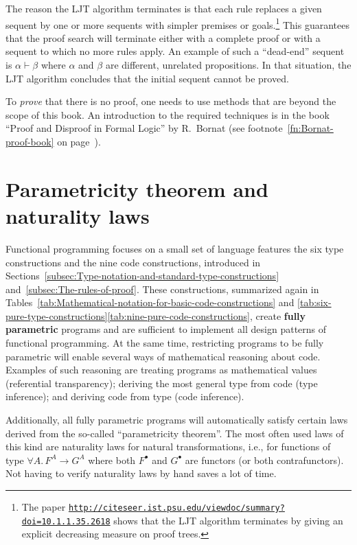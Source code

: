 The reason the LJT algorithm terminates is that each rule replaces
a given sequent by one or more sequents with simpler premises or goals.\footnote{The paper \texttt{\href{http://citeseer.ist.psu.edu/viewdoc/summary?doi=10.1.1.35.2618}{http://citeseer.ist.psu.edu/viewdoc/summary?doi=10.1.1.35.2618}}
shows that the LJT algorithm terminates by giving an explicit decreasing
measure on proof trees.} This guarantees that the proof search will terminate either with
a complete proof or with a sequent to which no more rules apply. An
example of such a \textsf{``}dead-end\textsf{''} sequent is $\alpha\vdash\beta$ where
$\alpha$ and $\beta$ are different, unrelated propositions. In that
situation, the LJT algorithm concludes that the initial sequent cannot
be proved.

To \emph{prove} that there is no proof, one needs to use methods
that are beyond the scope of this book. An introduction to the required
techniques is in the book \textsf{``}Proof and Disproof in Formal Logic\textsf{''}
by R.~Bornat (see footnote~\ref{fn:Bornat-proof-book}
on page~\pageref{fn:Bornat-proof-book}).

\chapter{Parametricity theorem and naturality laws\label{app:Proofs-of-naturality-parametricity}}

Functional programming focuses on a small set of language features
\textemdash{} the six type constructions and the nine code constructions,
introduced in Sections~\ref{subsec:Type-notation-and-standard-type-constructions}
and~\ref{subsec:The-rules-of-proof}. These constructions, summarized
again in Tables~\ref{tab:Mathematical-notation-for-basic-code-constructions}
and \ref{tab:six-pure-type-constructions}\textendash \ref{tab:nine-pure-code-constructions},
create \textbf{fully parametric} programs
and are sufficient to implement all design patterns of functional
programming. At the same time, restricting programs to be fully parametric
will enable several ways of mathematical reasoning about code. Examples
of such reasoning are treating programs as mathematical values (referential
transparency); deriving the most
general type from code (type inference); and
deriving code from type (code inference).

Additionally, all fully parametric programs will automatically satisfy
certain laws derived from the so-called \textsf{``}parametricity theorem\textsf{''}.
The most often used laws of this kind are naturality laws for natural
transformations, i.e., for functions of type $\forall A.\,F^{A}\rightarrow G^{A}$
where both $F^{\bullet}$ and $G^{\bullet}$ are functors (or both
contrafunctors). Not having to verify naturality laws by hand saves
a lot of time.

